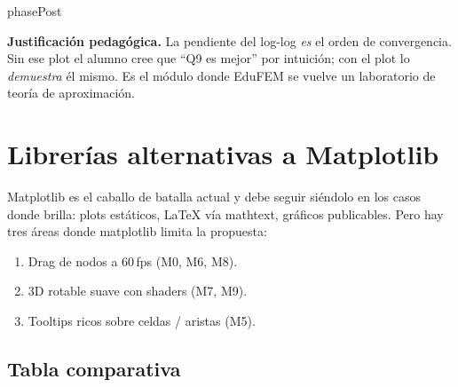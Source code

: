 \documentclass[11pt,a4paper]{article}
\begin{document}
\begin{moduleBox}{phasePost}
\begin{center}
\end{center}

\textbf{Justificación pedagógica.} La pendiente del log-log \emph{es} el
orden de convergencia. Sin ese plot el alumno cree que ``Q9 es mejor'' por
intuición; con el plot lo \emph{demuestra} él mismo. Es el módulo donde
EduFEM se vuelve un laboratorio de teoría de aproximación.

\end{moduleBox}

\newpage

\section{Librerías alternativas a Matplotlib}

Matplotlib es el caballo de batalla actual y debe seguir siéndolo en los
casos donde brilla: plots estáticos, LaTeX vía mathtext, gráficos
publicables. Pero hay tres áreas donde matplotlib limita la propuesta:

\begin{enumerate}[leftmargin=1.2em, itemsep=2pt]
  \item Drag de nodos a 60\,fps (M0, M6, M8).
  \item 3D rotable suave con shaders (M7, M9).
  \item Tooltips ricos sobre celdas / aristas (M5).
\end{enumerate}

\subsection{Tabla comparativa}
\end{document}
